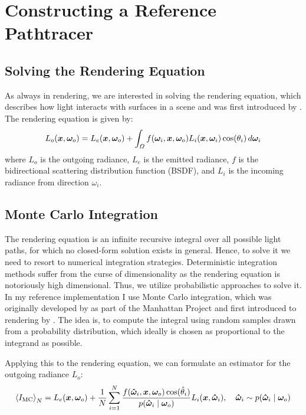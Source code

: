 
\chapter{Constructing a Reference Pathtracer}
\label{chap:pathtracing}

\section{Solving the Rendering Equation}

As always in rendering, we are interested in solving the rendering equation, which describes how light interacts with surfaces in a scene and was first introduced by \textcite{kajiya1986}.
The rendering equation is given by:
\begin{equation}
\label{eq:rendering_equation}
    L_o(\bm{x}, \bm{\omega}_o) = L_e(\bm{x}, \bm{\omega}_o) + \int_{\Omega} f(\bm{\omega}_i, \bm{x}, \bm{\omega}_o) L_i(\bm{x}, \bm{\omega}_i) \cos(\theta_i) \mathop{}\!d\bm{\omega}_i
\end{equation}
where $L_o$ is the outgoing radiance, $L_e$ is the emitted radiance, $f$ is the bidirectional scattering distribution function (BSDF), and $L_i$ is the incoming radiance from direction $\omega_i$.

\section{Monte Carlo Integration}

The rendering equation is an infinite recursive integral over all possible light paths, for which no closed-form solution exists in general.
Hence, to solve it we need to resort to numerical integration strategies.
Deterministic integration methods suffer from the curse of dimensionality as the rendering equation is notoriously high dimensional.
Thus, we utilize probabilistic approaches to solve it.
In my reference implementation I use Monte Carlo integration, which was originally developed by \textcite{metropolis1949} as part of the Manhattan Project and first introduced to rendering by \textcite{kajiya1986}.
The idea is, to compute the integral using random samples drawn from a probability distribution, which ideally is chosen as proportional to the integrand as possible.

Applying this to the rendering equation, we can formulate an estimator for the outgoing radiance $L_o$:
\begin{equation}
    \estimator{I_\mathrm{MC}} = L_e(\vec{x}, \wo) + \frac{1}{N} \sum_{i=1}^{N} \frac{f(\vec{\hat{\omega}}_i, \vec{x}, \wo) \cos(\hat{\theta}_i)}{p(\vec{\hat{\omega}}_i \mid \wo)} L_i(\vec{x}, \vec{\hat{\omega}}_i), \quad \vec{\hat{\omega}}_i \sim p(\vec{\hat{\omega}}_i \mid \wo)
\end{equation}

